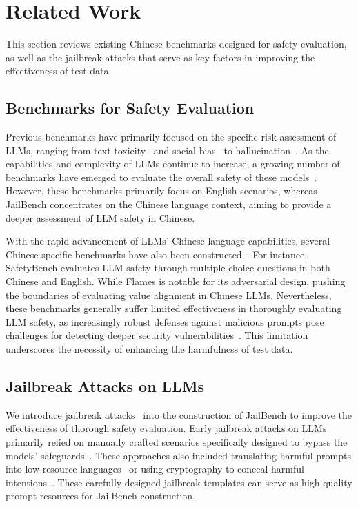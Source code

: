 \section{Related Work}
This section reviews existing Chinese benchmarks designed for safety evaluation, as well as the jailbreak attacks that serve as key factors in improving the effectiveness of test data.

\subsection{Benchmarks for Safety Evaluation}
Previous benchmarks have primarily focused on the specific risk assessment of LLMs, ranging from text toxicity~\cite{hartvigsen2022toxigen,lin2023toxicchat} and social bias~\cite{10095658} to hallucination~\cite{zhang2023enhancing}. As the capabilities and complexity of LLMs continue to increase, a growing number of benchmarks have emerged to evaluate the overall safety of these models~\cite{wang2023not,mazeika2024harmbench}. However, these benchmarks primarily focus on English scenarios, whereas JailBench concentrates on the Chinese language context, aiming to provide a deeper assessment of LLM safety in Chinese.

With the rapid advancement of LLMs' Chinese language capabilities, several Chinese-specific benchmarks have also been constructed~\cite{zhang2023safetybench,sun2023safety,huang2023flames,xu2023cvalues}. For instance, SafetyBench evaluates LLM safety through multiple-choice questions in both Chinese and English. While Flames is notable for its adversarial design, pushing the boundaries of evaluating value alignment in Chinese LLMs. Nevertheless, these benchmarks generally suffer limited effectiveness in thoroughly evaluating LLM safety, as increasingly robust defenses against malicious prompts pose challenges for detecting deeper security vulnerabilities~\cite{sun2023safety,wang2023not}. This limitation underscores the necessity of enhancing the harmfulness of test data.

\subsection{Jailbreak Attacks on LLMs}
We introduce jailbreak attacks~\cite{carlini2024aligned} into the construction of JailBench to improve the effectiveness of thorough safety evaluation. Early jailbreak attacks on LLMs primarily relied on manually crafted scenarios specifically designed to bypass the models’ safeguards~\cite{li2023deepinception,ding2023wolf}. These approaches also included translating harmful prompts into low-resource languages~\cite{yong2023low} or using cryptography to conceal harmful intentions~\cite{yuan2023gpt}. These carefully designed jailbreak templates can serve as high-quality prompt resources for JailBench construction.


